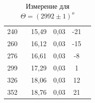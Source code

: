 \documentclass[a4paper,12pt]{report}
\begin{document}
\begin{table}[H]
\begin{tabular}{|c|c|c|c|c|c|}
240 &                     & 15,49 & 0,03 & -21 &                     \\ \cline{1-1} \cline{3-5}
260 &                     & 16,12 & 0,03 & -15 &                     \\ \cline{1-1} \cline{3-5}
276 &                     & 16,61 & 0,03 & -8  &                     \\ \cline{1-1} \cline{3-5}
299 &                     & 17,29 & 0,03 & 1   &                     \\ \cline{1-1} \cline{3-5}
326 &                     & 18,06 & 0,03 & 12  &                     \\ \cline{1-1} \cline{3-5}
352 &                     & 18,76 & 0,03 & 21  &                     \\ \hline
\end{tabular}
\caption{Измерение для $\Theta = (2992\pm 1) ^{o}$}
\end{table}
\end{document}
